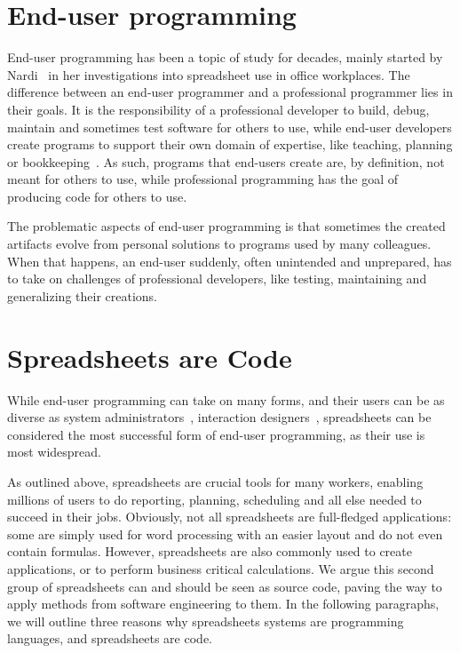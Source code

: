 \documentclass[conference]{IEEEtran}
\begin{document}
\section{End-user programming}
End-user programming has been a topic of study for decades, mainly started by Nardi~\cite{Nardi1993} in her investigations into spreadsheet use in office workplaces. The difference between an end-user programmer and a professional programmer lies in their goals. It is the responsibility of a professional developer to build, debug, maintain and sometimes test software for others to use, while end-user developers create programs to support their own domain of expertise, like teaching, planning or bookkeeping~\cite{Ko2011}. As such, programs that end-users create are, by definition, not meant for others to use, while professional programming has the goal of producing code for others to use. 

The problematic aspects of end-user programming is that sometimes the created artifacts evolve from personal solutions to programs used by many colleagues. When that happens, an end-user suddenly, often unintended and unprepared, has to take on challenges of professional developers, like testing, maintaining and generalizing their creations. 


\section{Spreadsheets are Code}
While end-user programming can take on many forms, and their users can be as diverse as system administrators~\cite{Barrett2004}, interaction designers~\cite{Ko2004, brandt_opportunistic_2008, myers_how_2008}, spreadsheets can be considered the most successful form of end-user programming, as their use is most widespread.

As outlined above, spreadsheets are crucial tools for many workers, enabling millions of users to do reporting, planning, scheduling and all else needed to succeed in their jobs. Obviously, not all spreadsheets are full-fledged applications: some are simply used for word processing with an easier layout and do not even contain formulas. However, spreadsheets are also commonly used to create applications, or to perform business critical calculations. We argue this second group of spreadsheets can and should be seen as source code, paving the way to apply methods from software engineering to them. In the following paragraphs, we will outline three reasons why spreadsheets systems are programming languages, and spreadsheets are code.
\end{document}
